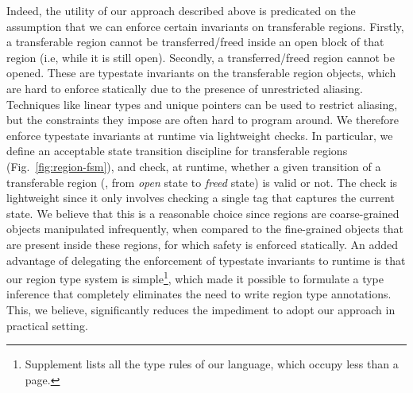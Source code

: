 Indeed, the utility of our approach described above is predicated
on the assumption that we can enforce certain invariants on
transferable regions. Firstly, a transferable region cannot be
transferred/freed inside an open block of that region (i.e, while it
is still open).  Secondly, a transferred/freed region cannot be
opened. These are typestate invariants on the transferable region
objects, which are hard to enforce statically due to the presence of
unrestricted aliasing. Techniques like linear types and unique
pointers can be used to restrict aliasing, but the constraints they
impose are often hard to program around. We therefore enforce
typestate invariants at runtime via lightweight checks. In
particular, we define an acceptable state transition discipline for
transferable regions (Fig.~\ref{fig:region-fsm}), and check, at
runtime, whether a given transition of a transferable region (\eg,
from \emph{open} state to \emph{freed} state) is valid or not. The
check is lightweight since it only involves checking a single tag that
captures the current state.  We believe that this is a reasonable
choice since regions are coarse-grained objects manipulated
infrequently, when compared to the fine-grained objects that are
present inside these regions, for which safety is enforced statically.
An added advantage of delegating the enforcement of typestate
invariants to runtime is that our region type system is
simple\footnote{Supplement lists all the type rules of our language,
which occupy less than a page.}, which made it possible to formulate a
type inference that completely eliminates the need to write region
type annotations. This, we believe, significantly reduces the
impediment to adopt our approach in practical setting.



